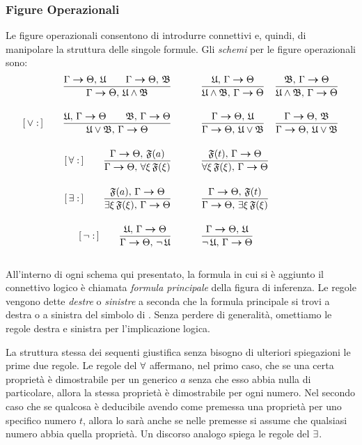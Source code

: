 	\subsubsection{Figure Operazionali}
		Le figure operazionali consentono di introdurre connettivi e, quindi, di manipolare la struttura delle singole formule. Gli \emph{schemi} per le figure operazionali sono:
		\smallskip
	\begin{align}
		[\,\ee:\,]\qquad \frac{\Gamma \seq \Theta,\,\gothU \qquad \Gamma \seq \Theta,\,\gothB}{\Gamma \seq \Theta,\,\gothU \ee \gothB} \quad & \qquad \frac{\gothU,\,\Gamma \seq \Theta}{\gothU \ee \gothB,\,\Gamma \seq \Theta} \quad \frac{\gothB,\,\Gamma \seq \Theta}{\gothU \ee \gothB,\,\Gamma \seq \Theta} \nonumber \\[4mm]
		[\,\oo:\,]\qquad \frac{\gothU,\,\Gamma \seq \Theta \qquad \gothB,\,\Gamma \seq \Theta}{\gothU \oo \gothB,\,\Gamma \seq \Theta} \quad & \qquad \frac{\Gamma \seq \Theta,\,\gothU}{\Gamma \seq \Theta,\,\gothU \oo \gothB} \quad \frac{\Gamma \seq \Theta,\,\gothB}{\Gamma \seq \Theta,\,\gothU \oo \gothB} \nonumber \\[4mm]
		[\,\perogni:\,]\qquad \frac{\Gamma \seq \Theta,\,\gothF(a)}{\Gamma \seq \Theta,\,\perogni \xi\,\gothF(\xi)} \quad & \qquad \frac{\gothF(t),\,\Gamma \seq \Theta}{\perogni \xi\,\gothF(\xi),\,\Gamma \seq \Theta} \nonumber \\[4mm]
		[\,\esiste:\,]\qquad \frac{\gothF(a),\,\Gamma \seq \Theta}{\esiste \xi\,\gothF(\xi),\,\Gamma \seq \Theta} \quad & \qquad \frac{\Gamma \seq \Theta,\,\gothF(t)}{\Gamma \seq \Theta,\,\esiste \xi\,\gothF(\xi)} \nonumber \\[4mm]
		[\,\nn:\,]\qquad \frac{\gothU,\,\Gamma \seq \Theta}{\Gamma \seq \Theta,\,\nn\,\gothU} \quad & \qquad \frac{\Gamma \seq \Theta,\,\gothU}{\nn\,\gothU,\,\Gamma \seq \Theta} \nonumber
	\end{align}
		\\[2mm]
		All'interno di ogni schema qui presentato, la formula in cui si è aggiunto il connettivo logico è chiamata \emph{formula principale} della figura di inferenza. Le regole vengono dette \emph{destre} o \emph{sinistre} a seconda che la formula principale si trovi a destra o a sinistra del simbolo di . Senza perdere di generalità, omettiamo le regole destra e sinistra per l'implicazione logica.  
		
		La struttura stessa dei sequenti giustifica senza bisogno di ulteriori spiegazioni le prime due regole.
		Le regole del $\forall$ affermano, nel primo caso, che se una certa proprietà è dimostrabile per un generico $a$ senza che esso abbia nulla di particolare, allora la stessa proprietà è dimostrabile per ogni numero. Nel secondo caso che se qualcosa è deducibile avendo come premessa una proprietà per uno specifico numero $t$, allora lo sarà anche se nelle premesse si assume che qualsiasi numero abbia quella proprietà. Un discorso analogo spiega le regole del $\exists$.
		
